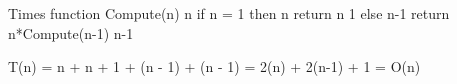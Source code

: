 \documentclass[a4paper]{article}
\begin{document}
\bigskip
\hfill Times
\newline
\noindent
function Compute(n) \hfill n
\newline
\indent 
if n = 1 then \hfill n
\newline
\indent\indent
return n \hfill 1
\newline
\indent
else \hfill n-1
\newline
\indent\indent
return n*Compute(n-1) \hfill n-1

\bigskip
\noindent
T(n) = n + n + 1 + (n - 1) + (n - 1) = 2(n) + 2(n-1) + 1 = O(n)
\end{document}
